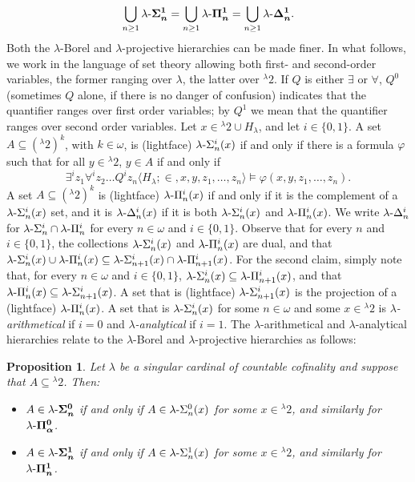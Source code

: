 \documentclass{amsart}
\numberwithin{equation}{section}
\def\hyp{{\hbox{-}}}
\newtheorem{proposition}[theorem]{Proposition}
\theoremstyle{definition}
\theoremstyle{remark}
\begin{document}
    \begin{equation*}
	\bigcup_{n\geq 1}\lambda\hyp\boldsymbol{\Sigma^1_n}=\bigcup_{n\geq1}\lambda\hyp\boldsymbol{\Pi^1_n}=\bigcup_{n\geq1}\lambda\hyp\boldsymbol{\Delta^1_n}.
	\end{equation*}
	Both the $\lambda$-Borel and $\lambda$-projective hierarchies can be made finer. In what follows, we work in the language of set theory allowing both first- and second-order variables, the former ranging over $\lambda$, the latter over ${}^{\lambda}2$. If $Q$ is either $\exists$ or $\forall$, $Q^0$ (sometimes $Q$ alone, if there is no danger of confusion) indicates that the quantifier ranges over first order variables; by $Q^{1}$ we mean that the quantifier ranges over second order variables. Let $x\in{}^{\lambda}2\cup H_\lambda$, and let $i\in\{0,1\}$. A set $A\subseteq({}^{\lambda}2)^{k}$, with $k\in\omega$, is (lightface) $\lambda\hyp\Sigma^i_n(x)$ if and only if there is a formula $\varphi$ such that for all $y\in{}^{\lambda}2$, $y\in A$ if and only if 
		\[
			\exists^i z_1\forall^i z_2\ldots Q^i z_n\langle H_\lambda;\in,x,y,z_1,\ldots,z_n\rangle \vDash\varphi(x,y,z_1,\ldots,z_n).
		\]
	A set $A\subseteq ({}^{\lambda}2)^{k}$ is (lightface) $\lambda\hyp\Pi^i_n(x)$ if and only if it is the complement of a $\lambda\hyp\Sigma^i_n(x)$ set, and it is $\lambda\hyp\Delta^i_n(x)$ if it is both $\lambda\hyp\Sigma^i_n(x)$ and $\lambda\hyp\Pi^i_n(x)$. We write $\lambda\hyp\Delta^i_n$ for $\lambda\hyp\Sigma^i_n\cap\lambda\hyp\Pi^i_n$ for every $n\in\omega$ and $i\in\{0,1\}$. 
	Observe that for every $n$ and $i\in\{0,1\}$, the collections $\lambda\hyp\Sigma^i_n(x)$ and $\lambda\hyp\Pi^i_n(x)$ are dual, and that $\lambda\hyp\Sigma^i_n(x)\cup\lambda\hyp\Pi^i_n(x)\subseteq\lambda\hyp\Sigma^i_{n+1}(x)\cap\lambda\hyp\Pi^i_{n+1}(x)$. For the second claim, simply note that, for every $n\in\omega$ and $i\in\{0,1\}$, $\lambda\hyp\Sigma^i_n(x)\subseteq\lambda\hyp\Pi^i_{n+1}(x)$, and that $\lambda\hyp\Pi^i_n(x)\subseteq\lambda\hyp\Sigma^i_{n+1}(x)$. A set that is (lightface) $\lambda\hyp\Sigma^i_{n+1}(x)$ is the projection of a (lightface) $\lambda\hyp\Pi^i_n(x)$. A set that is $\lambda\hyp\Sigma^i_n(x)$ for some $n\in\omega$ and some $x\in{}^{\lambda}2$ is \emph{$\lambda$-arithmetical} if $i=0$ and \emph{$\lambda$-analytical} if $i=1$. The $\lambda$-arithmetical and $\lambda$-analytical hierarchies relate to the $\lambda$-Borel and $\lambda$-projective hierarchies as follows: 
	
	\begin{proposition}\label{p24} Let $\lambda$ be a singular cardinal of countable cofinality and suppose that $A\subseteq {}^{\lambda}2$. Then:
		\begin{itemize}
			\item[\emph{(1)}] $A\in\lambda\hyp\boldsymbol{\Sigma^0_n}$ if and only if $A\in\lambda\hyp\Sigma^0_n(x)$ for some $x\in {}^{\lambda}2$, and similarly for $\lambda\hyp\boldsymbol{\Pi^0_\alpha}$.
			\item[\emph{(2)}] $A\in\lambda\hyp\boldsymbol{\Sigma^1_n}$ if and only if $A\in\lambda\hyp\Sigma^1_n(x)$ for some $x\in {}^{\lambda}2$, and similarly for $\lambda\hyp\boldsymbol{\Pi^1_n}$.
		\end{itemize}
	\end{proposition}
\end{document}
